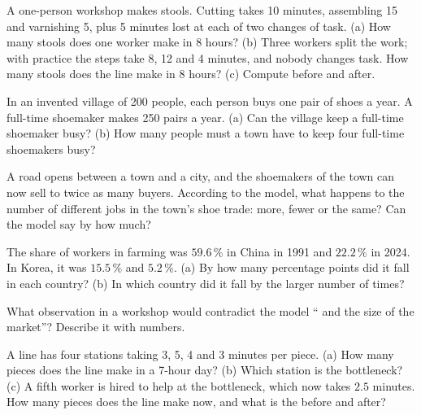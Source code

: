 \begin{exercise}[$\star\star$]\label{exo:g7:specialisation:5}
A one-person workshop makes stools. Cutting takes 10 minutes, assembling 15 and
varnishing 5, plus 5 minutes lost at each of two changes of task. (a) How many stools
does one worker make in 8 hours? (b) Three workers split the work; with practice the
steps take 8, 12 and 4 minutes, and nobody changes task. How many stools does the line
make in 8 hours? (c) Compute  before and after.
\end{exercise}

\begin{exercise}[$\star\star$]\label{exo:g7:specialisation:6}
In an invented village of 200 people, each person buys one pair of shoes a year. A
full-time shoemaker makes 250 pairs a year. (a) Can the village keep a full-time
shoemaker busy? (b) How many people must a town have to keep four full-time
shoemakers busy?
\end{exercise}

\begin{exercise}[$\star\star$]\label{exo:g7:specialisation:7}
A road opens between a town and a city, and the shoemakers of the town can now sell to
twice as many buyers. According to the model, what happens to the number of different
jobs in the town's shoe trade: more, fewer or the same? Can the model say by how
much?
\end{exercise}

\begin{exercise}[$\star\star$]\label{exo:g7:specialisation:8}
The share of workers in farming was $59.6\,\%$ in China in 1991 and $22.2\,\%$ in 2024.
In Korea, it was $15.5\,\%$ and $5.2\,\%$. (a) By how many percentage points did it fall
in each country? (b) In which country did it fall by the larger number of times?
\end{exercise}

\begin{exercise}[$\star\star$]\label{exo:g7:specialisation:9}
What observation in a workshop would contradict the model `` and the
size of the market''? Describe it with numbers.
\end{exercise}

\begin{exercise}[$\star\star\star$]\label{exo:g7:specialisation:10}
A line has four stations taking 3, 5, 4 and 3 minutes per piece. (a) How many pieces
does the line make in a 7-hour day? (b) Which station is the bottleneck? (c) A fifth
worker is hired to help at the bottleneck, which now takes $2.5$ minutes. How many
pieces does the line make now, and what is the  before and after?
\end{exercise}

